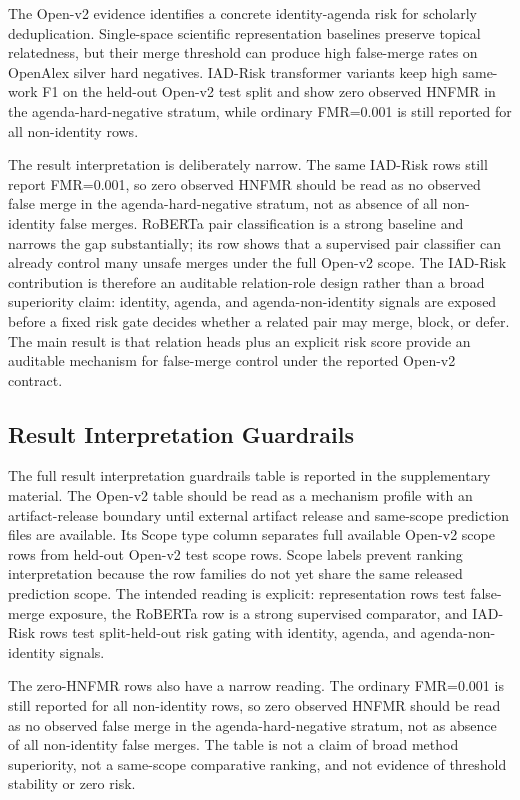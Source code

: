 \documentclass[11pt]{article}
\begin{document}
The Open-v2 evidence identifies a concrete identity-agenda risk for scholarly deduplication. Single-space scientific representation baselines preserve topical relatedness, but their merge threshold can produce high false-merge rates on OpenAlex silver hard negatives. IAD-Risk transformer variants keep high same-work F1 on the held-out Open-v2 test split and show zero observed HNFMR in the agenda-hard-negative stratum, while ordinary FMR=0.001 is still reported for all non-identity rows.

The result interpretation is deliberately narrow. The same IAD-Risk rows still report FMR=0.001, so zero observed HNFMR should be read as no observed false merge in the agenda-hard-negative stratum, not as absence of all non-identity false merges. RoBERTa pair classification is a strong baseline and narrows the gap substantially; its row shows that a supervised pair classifier can already control many unsafe merges under the full Open-v2 scope. The IAD-Risk contribution is therefore an auditable relation-role design rather than a broad superiority claim: identity, agenda, and agenda-non-identity signals are exposed before a fixed risk gate decides whether a related pair may merge, block, or defer. The main result is that relation heads plus an explicit risk score provide an auditable mechanism for false-merge control under the reported Open-v2 contract.

\subsection{Result Interpretation Guardrails}

The full result interpretation guardrails table is reported in the supplementary material. The Open-v2 table should be read as a mechanism profile with an artifact-release boundary until external artifact release and same-scope prediction files are available. Its Scope type column separates full available Open-v2 scope rows from held-out Open-v2 test scope rows. Scope labels prevent ranking interpretation because the row families do not yet share the same released prediction scope. The intended reading is explicit: representation rows test false-merge exposure, the RoBERTa row is a strong supervised comparator, and IAD-Risk rows test split-held-out risk gating with identity, agenda, and agenda-non-identity signals.

The zero-HNFMR rows also have a narrow reading. The ordinary FMR=0.001 is still reported for all non-identity rows, so zero observed HNFMR should be read as no observed false merge in the agenda-hard-negative stratum, not as absence of all non-identity false merges. The table is not a claim of broad method superiority, not a same-scope comparative ranking, and not evidence of threshold stability or zero risk.
\end{document}
